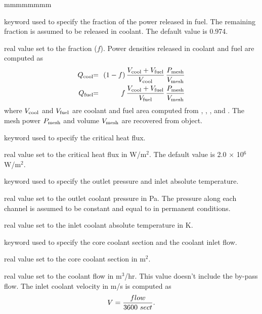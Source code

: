 \begin{ListeDeDescription}{mmmmmmmm}
\item[\moc{FPUISS}] keyword used to specify the fraction of the power released in fuel. The remaining
fraction is assumed to be released in coolant. The default value is 0.974.

\item[\dusa{fract}] real value set to the fraction ($f$). Power densities released in coolant and
fuel are computed as
\begin{eqnarray*}
Q_{\rm cool} \negthinspace\negthinspace &=& \negthinspace\negthinspace (1-f)\, {V_{\rm cool}+V_{\rm fuel} \over V_{\rm cool}} \, {P_{\rm mesh} \over
V_{\rm mesh}} \\
Q_{\rm fuel} \negthinspace\negthinspace &=& \negthinspace\negthinspace f\, {V_{\rm cool}+V_{\rm fuel} \over V_{\rm fuel}} \, {P_{\rm mesh} \over
V_{\rm mesh}}
\end{eqnarray*}
\noindent where $V_{\rm cool}$ and $V_{\rm fuel}$ are coolant and fuel area computed from
, , ,  and . The mesh power $P_{\rm mesh}$ and
volume $V_{\rm mesh}$ are recovered from  object.

\item[\moc{CRITFL}] keyword used to specify the critical heat flux.

\item[\dusa{cflux}] real value set to the critical heat flux in W/m$^2$. The default value is 2.0
$\times$ 10$^6$ W/m$^2$.

\item[\moc{INLET}] keyword used to specify the outlet pressure and inlet absolute temperature.

\item[\dusa{poutlet}] real value set to the outlet coolant pressure in Pa. The pressure along each channel is assumed to be
constant and equal to  in permanent conditions.

\item[\dusa{tinlet}] real value set to the inlet coolant absolute temperature in K.

\item[\moc{CWSECT}] keyword used to specify the core coolant section and the coolant inlet flow.

\item[\dusa{sect}] real value set to the core coolant section in m$^2$.

\item[\dusa{flow}] real value set to the coolant flow in m$^3$/hr. This value doesn't include the by-pass flow.
The inlet coolant velocity in m/s is computed as $$V={{\sl flow} \over 3600 \ {\sl sect}}.$$


\end{ListeDeDescription}
